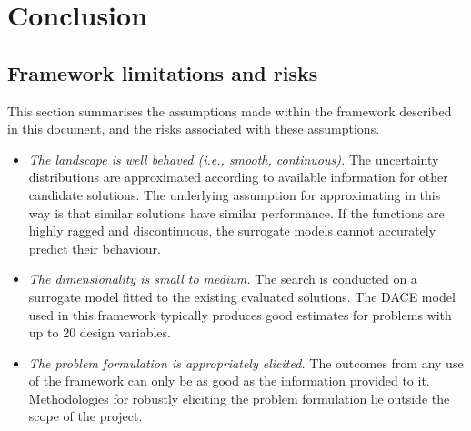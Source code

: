 \documentclass[10pt]{llncs}
\begin{document}
\section{Conclusion}
\label{sec:conclusion}

\subsection{Framework limitations and risks}
This section summarises the assumptions made within the framework described in this document, and the risks associated with these assumptions.
\begin{itemize}
	\item \emph{The landscape is well behaved (i.e., smooth, continuous).} The uncertainty distributions are approximated according to available information for other candidate solutions. The underlying assumption for approximating in this way is that similar solutions have similar performance. If the functions are highly ragged and discontinuous, the surrogate models cannot accurately predict their behaviour.
	\item \emph{The dimensionality is small to medium.} The search is conducted on a surrogate model fitted to the existing evaluated solutions. The DACE model used in this framework typically produces good estimates for problems with up to 20 design variables.
	\item \emph{The problem formulation is appropriately elicited.} The outcomes from any use of the framework can only be as good as the information provided to it. Methodologies for robustly eliciting the problem formulation lie outside the scope of the project.
\end{itemize}




\end{document}

